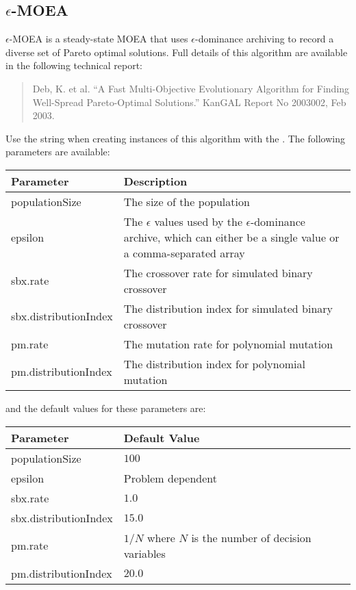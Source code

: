 \subsection{$\epsilon$-MOEA}
$\epsilon$-MOEA is a steady-state MOEA that uses $\epsilon$-dominance archiving to record a diverse set of Pareto optimal solutions.  Full details of this algorithm are available in the following technical report:
\begin{quote}
Deb, K. et al. ``A Fast Multi-Objective Evolutionary Algorithm for Finding Well-Spread Pareto-Optimal Solutions.'' KanGAL Report No 2003002, Feb 2003. 
\end{quote}
Use the string  when creating instances of this algorithm with the .  The following parameters are available:
\newline
\newline
\begin{tabularx}{\linewidth}{lX}
  \hline
  Parameter & Description \\
  \hline
  populationSize & The size of the population \\
  epsilon & The $\epsilon$ values used by the $\epsilon$-dominance archive, which can either be a single value or a comma-separated array \\
  sbx.rate & The crossover rate for simulated binary crossover \\
  sbx.distributionIndex & The distribution index for simulated binary crossover \\
  pm.rate & The mutation rate for polynomial mutation \\
  pm.distributionIndex & The distribution index for polynomial mutation \\
  \hline
\end{tabularx}
\newline
\newline
and the default values for these parameters are:
\newline
\newline
\begin{tabularx}{\linewidth}{lX}
  \hline
  Parameter & Default Value \\
  \hline
  populationSize & $100$ \\
  epsilon & Problem dependent \\
  sbx.rate & $1.0$ \\
  sbx.distributionIndex & $15.0$ \\
  pm.rate & $1/N$ where $N$ is the number of decision variables \\
  pm.distributionIndex & $20.0$ \\
  \hline
\end{tabularx}

